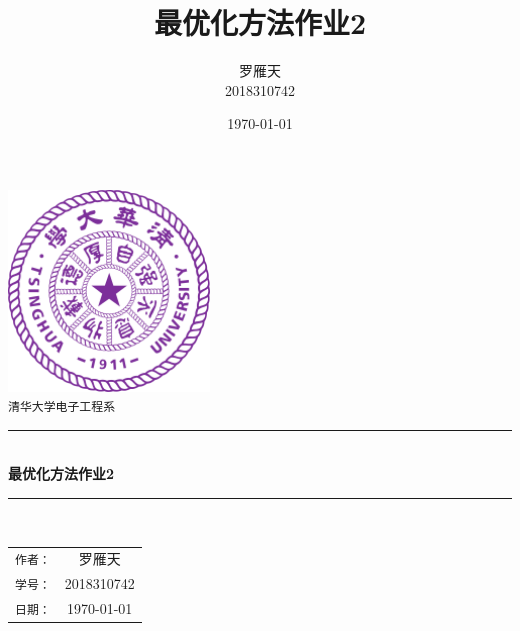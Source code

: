 \documentclass[a4paper]{article}
\title{最优化方法作业2}
\author{罗雁天 \\
2018310742}
\date{\today}
\begin{document}
\newcommand{\HRule}{\rule{\linewidth}{0.5mm}}
\begin{titlepage}
	\begin{center}
		\includegraphics[width=0.4\textwidth]{Tsinghua2.png}\\[1cm]
		\textsc{\Large \texttt{清华大学电子工程系}}\\[1cm]
		\HRule \\[1cm]
		{\Huge \bfseries 最优化方法作业2}\\[0.4cm]
		\HRule \\[3.5cm]
		\begin{minipage}{0.4\textwidth}
			\begin{center}
				\Large
				\begin{tabular}{cc}
					\texttt{作者：} & 罗雁天 \\[0.5cm]
					\texttt{学号：} & 2018310742 \\[0.5cm]
					\texttt{日期：} & \today
				\end{tabular}
			\end{center}
		\end{minipage}
		\vfill
	\end{center}
\end{titlepage}
\end{document}
